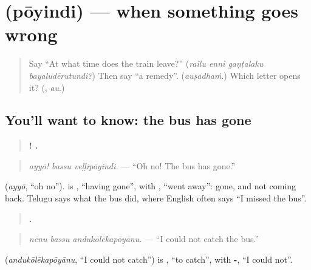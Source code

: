 \section[\texorpdfstring{\te{పోయింది} (pōyindi)}{పోయింది (pōyindi)}]{ (pōyindi) — when something goes wrong}

\label{lesson:TE-C321-poyindi}



\begin{quote}
Say \textquotedblleft{}At what time does the train leave?\textquotedblright{} (\emph{railu enni gaṇṭalaku bayaludērutundi?}) Then say \textquotedblleft{}a remedy\textquotedblright{}. (\emph{auṣadhaṁ}.) Which letter opens it? (\textbf{}, \emph{au}.)
\end{quote}

\subsection*{You'll want to know: the bus has gone}
\begin{quote}
\textbf{!  .}
\end{quote}

\begin{quote}
\emph{ayyō! bassu veḷḷipōyindi.} — \textquotedblleft{}Oh no! The bus has gone.\textquotedblright{}
\end{quote}

\textbf{} (\emph{ayyō}, \textquotedblleft{}oh no\textquotedblright{}). \textbf{} is \textbf{}, \textquotedblleft{}having gone\textquotedblright{}, with \textbf{}, \textquotedblleft{}went away\textquotedblright{}: gone, and not coming back. Telugu says what the bus did, where English often says \textquotedblleft{}I missed the bus\textquotedblright{}.

\begin{quote}
\textbf{  .}
\end{quote}

\begin{quote}
\emph{nēnu bassu andukōlēkapōyānu.} — \textquotedblleft{}I could not catch the bus.\textquotedblright{}
\end{quote}

\textbf{} (\emph{andukōlēkapōyānu}, \textquotedblleft{}I could not catch\textquotedblright{}) is \textbf{}, \textquotedblleft{}to catch\textquotedblright{}, with \textbf{-}, \textquotedblleft{}I could not\textquotedblright{}.

